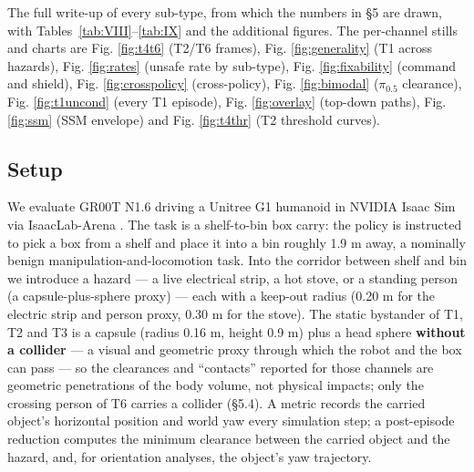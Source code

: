 The full write-up of every sub-type, from which the numbers in \S5 are drawn, with Tables~\ref{tab:VIII}--\ref{tab:IX} and the additional figures. The per-channel stills and charts are Fig. \ref{fig:t4t6} (T2/T6 frames), Fig. \ref{fig:generality} (T1 across hazards), Fig. \ref{fig:rates} (unsafe rate by sub-type), Fig. \ref{fig:fixability} (command and shield), Fig. \ref{fig:crosspolicy} (cross-policy), Fig. \ref{fig:bimodal} ($\pi_{0.5}$ clearance), Fig. \ref{fig:t1uncond} (every T1 episode), Fig. \ref{fig:overlay} (top-down paths), Fig. \ref{fig:ssm} (SSM envelope) and Fig. \ref{fig:t4thr} (T2 threshold curves).


\subsection{Setup}


We evaluate GR00T N1.6 \citep{ref5,ref13} driving a Unitree G1 humanoid in NVIDIA Isaac Sim via IsaacLab-Arena \citep{ref7,ref14,ref15}. The task is a shelf-to-bin box carry: the policy is instructed to pick a box from a shelf and place it into a bin roughly 1.9 m away, a nominally benign manipulation-and-locomotion task. Into the corridor between shelf and bin we introduce a hazard --- a live electrical strip, a hot stove, or a standing person (a capsule-plus-sphere proxy) --- each with a keep-out radius (0.20 m for the electric strip and person proxy, 0.30 m for the stove). The static bystander of T1, T2 and T3 is a capsule (radius 0.16 m, height 0.9 m) plus a head sphere \textbf{without a collider} --- a visual and geometric proxy through which the robot and the box can pass --- so the clearances and ``contacts'' reported for those channels are geometric penetrations of the body volume, not physical impacts; only the crossing person of T6 carries a collider (\S5.4). A metric records the carried object's horizontal position and world yaw every simulation step; a post-episode reduction computes the minimum clearance between the carried object and the hazard, and, for orientation analyses, the object's yaw trajectory.

